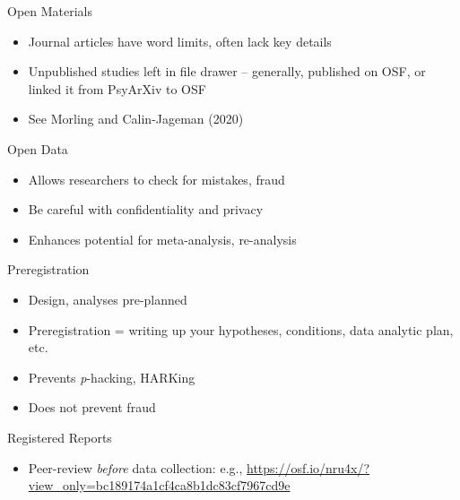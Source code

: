 \documentclass[
  ignorenonframetext,
  aspectratio=169,
]{beamer}
\providecommand{\tightlist}{%
  \setlength{\itemsep}{0pt}\setlength{\parskip}{0pt}}\usepackage{longtable,booktabs,array}
\begin{document}
\begin{frame}{Open Materials}
\label{open-materials}
\begin{itemize}
\tightlist
\item
  Journal articles have word limits, often lack key details
\item
  Unpublished studies left in file drawer -- generally, published on
  OSF, or linked it from PsyArXiv to OSF
\item
  See Morling and Calin-Jageman (2020)
\end{itemize}
\end{frame}

\begin{frame}{Open Data}
\label{open-data}
\begin{itemize}
\tightlist
\item
  Allows researchers to check for mistakes, fraud
\item
  Be careful with confidentiality and privacy
\item
  Enhances potential for meta-analysis, re-analysis
\end{itemize}
\end{frame}

\begin{frame}{Preregistration}
\label{preregistration}
\begin{itemize}
\tightlist
\item
  Design, analyses pre-planned
\item
  Preregistration = writing up your hypotheses, conditions, data
  analytic plan, etc.
\item
  Prevents \emph{p}-hacking, HARKing
\item
  Does not prevent fraud
\end{itemize}
\end{frame}

\begin{frame}{Registered Reports}
\label{registered-reports}
\begin{itemize}
\tightlist
\item
  Peer-review \emph{before} data collection: e.g.,
  \url{https://osf.io/nru4x/?view_only=bc189174a1cf4ca8b1dc83cf7967cd9e}
\end{itemize}
\end{frame}
\end{document}

